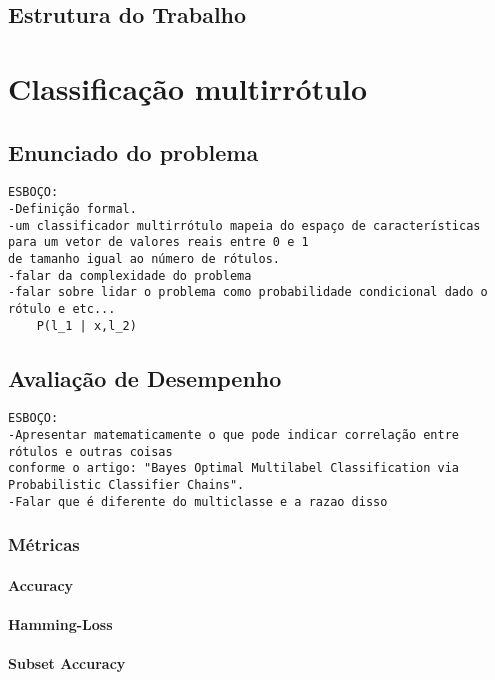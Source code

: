 \section{Estrutura do Trabalho}

\chapter{Classificação multirrótulo}

\section{Enunciado do problema}
\begin{verbatim}
ESBOÇO:
-Definição formal.
-um classificador multirrótulo mapeia do espaço de características
para um vetor de valores reais entre 0 e 1 
de tamanho igual ao número de rótulos.
-falar da complexidade do problema
-falar sobre lidar o problema como probabilidade condicional dado o rótulo e etc...
    P(l_1 | x,l_2)
\end{verbatim}



\section{Avaliação de Desempenho}
\begin{verbatim}
ESBOÇO:
-Apresentar matematicamente o que pode indicar correlação entre rótulos e outras coisas
conforme o artigo: "Bayes Optimal Multilabel Classification via Probabilistic Classifier Chains".
-Falar que é diferente do multiclasse e a razao disso
\end{verbatim}
\subsection{Métricas}
\label{sec:metrics}
\subsubsection{Accuracy}
\subsubsection{Hamming-Loss}
\subsubsection{Subset Accuracy}
